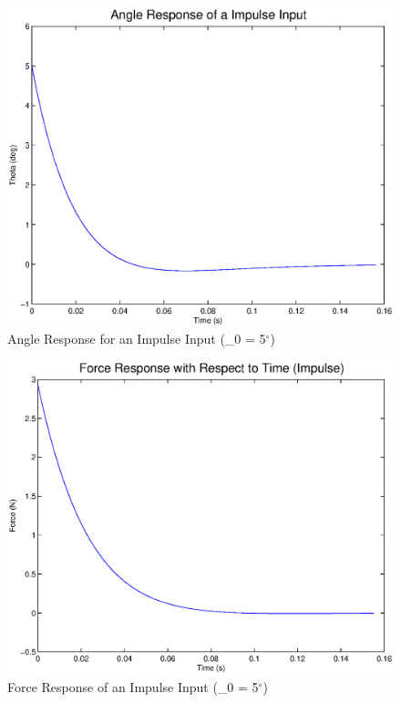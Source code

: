 \documentclass{article}
\begin{document}
\begin{figure}[!htb]
    \centering
    \includegraphics[scale=0.6]{3}
    \caption{Angle Response for an Impulse Input (\theta_0 = 5$^{\circ}$)}
\end{figure} 

\begin{figure}[!htb]
    \centering
    \includegraphics[scale=0.6]{4}
    \caption{Force Response of an Impulse Input (\theta_0 = 5$^{\circ}$)}
\end{figure} 
\end{document}

